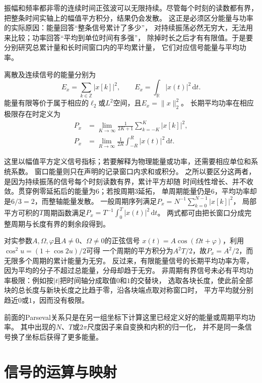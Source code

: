 振幅和频率都非零的连续时间正弦波可以无限持续。尽管每个时刻的读数都有界，
把整条时间实轴上的幅值平方积分，结果仍会发散。
这正是必须区分能量与功率的实际原因：能量回答“整条信号累计了多少”，
对持续振荡必然无穷大，无法用来比较；功率回答“平均到单位时间有多强”，
除掉时长之后才有有限值。于是要分别研究总累计量和长时间窗口内的平均累计量，
它们对应信号能量与平均功率。
\begin{definition}[信号能量与平均功率]
  \label{def:signal-energy-power}
  离散及连续信号的能量分别为
  \[
    E_x=\sum_{k\in\mathbb Z}|x[k]|^2,\qquad
    E_x=\int_{\mathbb R}|x(t)|^2\,\mathrm dt.
  \]
  能量有限等价于属于相应的$\ell_2$或$L^2$空间，且$E_x=\|x\|_2^2$。
  长期平均功率在相应极限存在时定义为
  \begin{align*}
    P_x&=\lim_{K\to\infty}\frac1{2K+1}\sum_{k=-K}^K|x[k]|^2,\\
    P_x&=\lim_{R\to\infty}\frac1{2R}\int_{-R}^R|x(t)|^2\,\mathrm dt.
  \end{align*}
\end{definition}

这里以幅值平方定义信号指标；若要解释为物理能量或功率，还需要相应单位和系统系数。
窗口能量则只在声明的记录窗口内求和或积分。
之所以要区分这两者，是因为持续振荡的信号每个时刻读数有界，累计平方却随
时间线性增长、并不收敛。贯穿例零延拓后的能量为$6$；若按周期$3$延拓，
单周期能量仍是$6$，平均功率却是$6/3=2$，而整轴能量发散。
一般周期序列满足$P_x=N^{-1}\sum_{k=0}^{N-1}|x[k]|^2$，
局部平方可积的$T$周期函数满足$P_x=T^{-1}\int_0^T|x(t)|^2\,\mathrm dt$。
两式都可由把长窗口分成完整周期与长度有界的剩余段得到。

对实参数$A,\Omega,\varphi$且$A\neq0$、$\Omega\neq0$的正弦信号
$x(t)=A\cos(\Omega t+\varphi)$，利用$\cos^2 u=(1+\cos2u)/2$可得
一个周期的平方积分为$A^2T/2$，故$P_x=A^2/2$，而无限多个周期的累计能量为无穷。
反过来，有限能量信号的长期平均功率为零，因为平均的分子不超过总能量，分母却趋于无穷。
非周期有界信号未必有平均功率极限：例如按$|t|$把时间轴分成取值$0$和$1$的交替块，
选取各块长度，使此前全部块的总长度与新块长度之比趋于零，沿各块端点取对称窗口时，
平方平均就分别趋近$0$或$1$，因而没有极限。

前面的Parseval关系只是在另一组坐标下计算这里已经定义好的能量或周期平均功率。
其中出现的$N$、$T$或$2\pi$尺度因子来自变换和内积的归一化，
并不是同一条信号换了坐标后获得了更多能量。

\section{信号的运算与映射}
\label{sec:signal-operations-maps}

